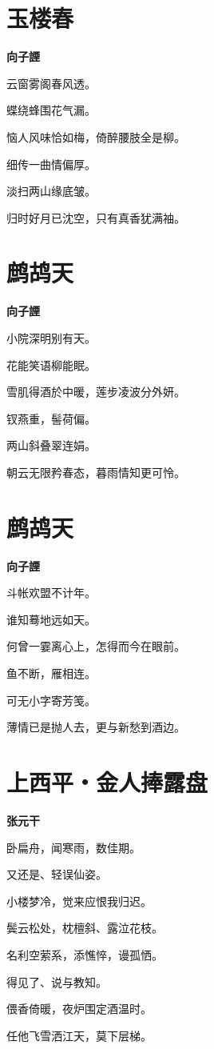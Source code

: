 \documentclass[12pt,a4paper]{ctexbook}
\begin{document}
\section{玉楼春}
\textbf{向子諲}\par\vspace{0.5em}
云窗雾阁春风透。\par
蝶绕蜂围花气漏。\par
恼人风味恰如梅，倚醉腰肢全是柳。\par
细传一曲情偏厚。\par
淡扫两山缘底皱。\par
归时好月已沈空，只有真香犹满袖。\par

\section{鹧鸪天}
\textbf{向子諲}\par\vspace{0.5em}
小院深明别有天。\par
花能笑语柳能眠。\par
雪肌得酒於中暖，莲步凌波分外妍。\par
钗燕重，髻荷偏。\par
两山斜叠翠连娟。\par
朝云无限矜春态，暮雨情知更可怜。\par

\section{鹧鸪天}
\textbf{向子諲}\par\vspace{0.5em}
斗帐欢盟不计年。\par
谁知蓦地远如天。\par
何曾一霎离心上，怎得而今在眼前。\par
鱼不断，雁相连。\par
可无小字寄芳笺。\par
薄情已是抛人去，更与新愁到酒边。\par

\section{上西平・金人捧露盘}
\textbf{张元干}\par\vspace{0.5em}
卧扁舟，闻寒雨，数佳期。\par
又还是、轻误仙姿。\par
小楼梦冷，觉来应恨我归迟。\par
鬓云松处，枕檀斜、露泣花枝。\par
名利空萦系，添憔悴，谩孤恓。\par
得见了、说与教知。\par
偎香倚暖，夜炉围定酒温时。\par
任他飞雪洒江天，莫下层梯。\par
\end{document}
